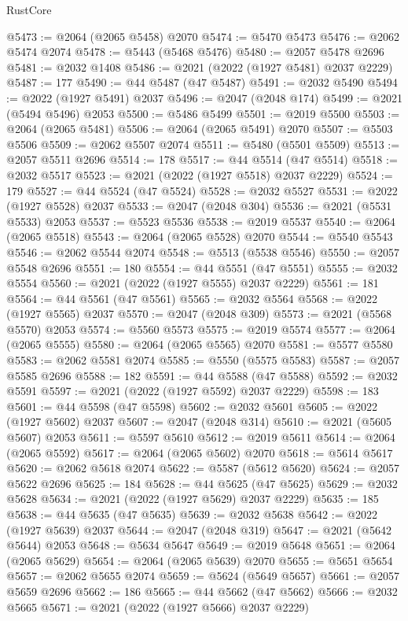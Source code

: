 \begin{lexlean}{RustCore}
\begin{coremodule}
@5473 := @2064 (@2065 @5458) @2070
@5474 := @5470 @5473
@5476 := @2062 @5474 @2074
@5478 := @5443 (@5468 @5476)
@5480 := @2057 @5478 @2696
@5481 := @2032 @1408
@5486 := @2021 (@2022 (@1927 @5481) @2037 @2229)
@5487 := 177
@5490 := @44 @5487 (@47 @5487)
@5491 := @2032 @5490
@5494 := @2022 (@1927 @5491) @2037
@5496 := @2047 (@2048 @174)
@5499 := @2021 (@5494 @5496) @2053
@5500 := @5486 @5499
@5501 := @2019 @5500
@5503 := @2064 (@2065 @5481)
@5506 := @2064 (@2065 @5491) @2070
@5507 := @5503 @5506
@5509 := @2062 @5507 @2074
@5511 := @5480 (@5501 @5509)
@5513 := @2057 @5511 @2696
@5514 := 178
@5517 := @44 @5514 (@47 @5514)
@5518 := @2032 @5517
@5523 := @2021 (@2022 (@1927 @5518) @2037 @2229)
@5524 := 179
@5527 := @44 @5524 (@47 @5524)
@5528 := @2032 @5527
@5531 := @2022 (@1927 @5528) @2037
@5533 := @2047 (@2048 @304)
@5536 := @2021 (@5531 @5533) @2053
@5537 := @5523 @5536
@5538 := @2019 @5537
@5540 := @2064 (@2065 @5518)
@5543 := @2064 (@2065 @5528) @2070
@5544 := @5540 @5543
@5546 := @2062 @5544 @2074
@5548 := @5513 (@5538 @5546)
@5550 := @2057 @5548 @2696
@5551 := 180
@5554 := @44 @5551 (@47 @5551)
@5555 := @2032 @5554
@5560 := @2021 (@2022 (@1927 @5555) @2037 @2229)
@5561 := 181
@5564 := @44 @5561 (@47 @5561)
@5565 := @2032 @5564
@5568 := @2022 (@1927 @5565) @2037
@5570 := @2047 (@2048 @309)
@5573 := @2021 (@5568 @5570) @2053
@5574 := @5560 @5573
@5575 := @2019 @5574
@5577 := @2064 (@2065 @5555)
@5580 := @2064 (@2065 @5565) @2070
@5581 := @5577 @5580
@5583 := @2062 @5581 @2074
@5585 := @5550 (@5575 @5583)
@5587 := @2057 @5585 @2696
@5588 := 182
@5591 := @44 @5588 (@47 @5588)
@5592 := @2032 @5591
@5597 := @2021 (@2022 (@1927 @5592) @2037 @2229)
@5598 := 183
@5601 := @44 @5598 (@47 @5598)
@5602 := @2032 @5601
@5605 := @2022 (@1927 @5602) @2037
@5607 := @2047 (@2048 @314)
@5610 := @2021 (@5605 @5607) @2053
@5611 := @5597 @5610
@5612 := @2019 @5611
@5614 := @2064 (@2065 @5592)
@5617 := @2064 (@2065 @5602) @2070
@5618 := @5614 @5617
@5620 := @2062 @5618 @2074
@5622 := @5587 (@5612 @5620)
@5624 := @2057 @5622 @2696
@5625 := 184
@5628 := @44 @5625 (@47 @5625)
@5629 := @2032 @5628
@5634 := @2021 (@2022 (@1927 @5629) @2037 @2229)
@5635 := 185
@5638 := @44 @5635 (@47 @5635)
@5639 := @2032 @5638
@5642 := @2022 (@1927 @5639) @2037
@5644 := @2047 (@2048 @319)
@5647 := @2021 (@5642 @5644) @2053
@5648 := @5634 @5647
@5649 := @2019 @5648
@5651 := @2064 (@2065 @5629)
@5654 := @2064 (@2065 @5639) @2070
@5655 := @5651 @5654
@5657 := @2062 @5655 @2074
@5659 := @5624 (@5649 @5657)
@5661 := @2057 @5659 @2696
@5662 := 186
@5665 := @44 @5662 (@47 @5662)
@5666 := @2032 @5665
@5671 := @2021 (@2022 (@1927 @5666) @2037 @2229)

\end{coremodule}
\end{lexlean}
